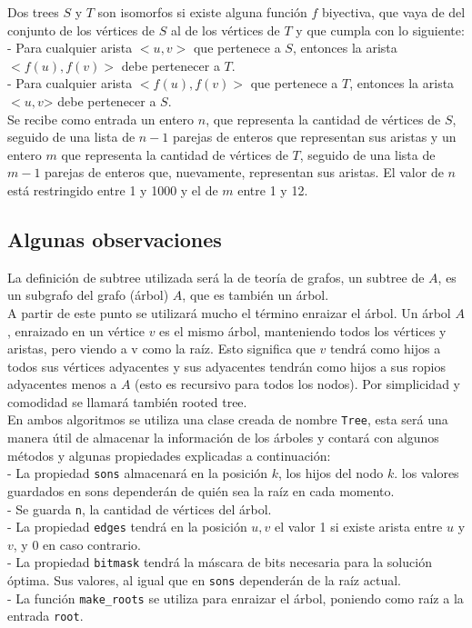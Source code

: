 \documentclass[a4paper,12pt,twocolumn]{article}
\begin{document}
  Dos trees $S$ y $T$ son isomorfos si existe alguna función $f$ biyectiva, que vaya de del conjunto de los vértices de $S$ al de los vértices de $T$ y que cumpla con lo siguiente:\\
  
  - Para cualquier arista $<u, v>$ que pertenece a $S$, entonces la arista $<f(u), f(v)>$ debe pertenecer a $T$.\\
  - Para cualquier arista $<f(u), f(v)>$ que pertenece a $T$, entonces la arista $<u, v$> debe pertenecer a $S$.\\
  
  Se recibe como entrada un entero $n$, que representa la cantidad de vértices de $S$, seguido de una lista de $n-1$ parejas de enteros que representan sus aristas y un entero $m$ que representa la cantidad de vértices de $T$, seguido de una lista de $m-1$ parejas de enteros que, nuevamente, representan sus aristas. El valor de $n$ está restringido entre 1 y 1000 y el de $m$ entre 1 y 12.
  
  \subsection{Algunas observaciones}\label{sub:results}
  La definición de subtree utilizada será la de teoría de grafos, un subtree de $A$, es un subgrafo del grafo (árbol) $A$, que es también un árbol.\\
  
  A partir de este punto se utilizará mucho el término enraizar el árbol. Un árbol $A$, enraizado en un vértice $v$ es el mismo árbol, manteniendo todos los vértices y aristas, pero viendo a v como la raíz. Esto significa que $v$ tendrá como hijos a todos sus vértices adyacentes y sus adyacentes tendrán como hijos a sus ropios adyacentes menos a $A$ (esto es recursivo para todos los nodos). Por simplicidad y comodidad se llamará también rooted tree.\\
  
  En ambos algoritmos se utiliza una clase creada de nombre \texttt{\ttfamily Tree}, esta será una manera útil de almacenar la información de los árboles y contará con algunos métodos y algunas propiedades explicadas a continuación:\\
  
  - La propiedad \texttt{\ttfamily sons} almacenará en la posición $k$, los hijos del nodo $k$. los valores guardados en sons dependerán de quién sea la raíz en cada momento.\\
  - Se guarda \texttt{\ttfamily n}, la cantidad de vértices del árbol.\\
  - La propiedad \texttt{\ttfamily edges} tendrá en la posición $u,v$ el valor 1 si existe arista entre $u$ y $v$, y 0 en caso contrario.\\
  - La propiedad \texttt{\ttfamily bitmask} tendrá la máscara de bits necesaria para la solución óptima. Sus valores, al igual que en \texttt{\ttfamily sons} dependerán de la raíz actual.\\
  - La función \texttt{\ttfamily make\_roots} se utiliza para enraizar el árbol, poniendo como raíz a la entrada \texttt{\ttfamily root}.\\
  
\end{document}
